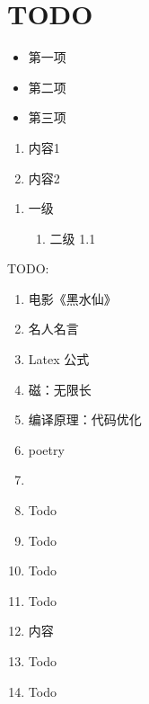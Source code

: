 \section*{TODO}
\begin{itemize}
  \item 第一项
  \item 第二项
  \item 第三项
\end{itemize}


\begin{enumerate}[label=(\alph*)]
  \item 内容1
  \item 内容2
\end{enumerate}

\begin{enumerate}[label=\arabic*., ref=\arabic*]
  \item 一级
  \begin{enumerate}[label=\arabic*., ref=\theenumi.\arabic*]
    \item 二级 1.1
  \end{enumerate}
\end{enumerate}

TODO:
\begin{enumerate}
  \renewcommand{\labelenumi}{(\arabic*)}   %
  \item 电影《黑水仙》
  \item 名人名言
  \item Latex 公式
  \item 磁：无限长
  \item 编译原理：代码优化
  \renewcommand{\labelenumi}{\roman*)}     %
  \item poetry
  \item \cc
  \item Todo
  \renewcommand{\labelenumi}{\Alph*)}      %
  \item Todo
  \item Todo
  \item Todo
  \renewcommand{\labelenumi}{\alph*)}      %
  \item 内容
  \item Todo
  \item Todo
\end{enumerate}
